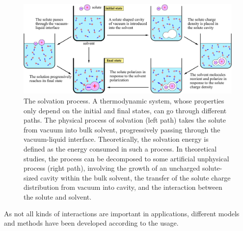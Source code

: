 \begin{figure}[h]
\centering{}\textcolor{red}{}%
\begin{minipage}[t]{1\textwidth}%
\begin{center}
\includegraphics[width=1\columnwidth]{_figure/solvation}\caption[The solvation process]{The solvation process.\label{fig:Process-of-solvation} A thermodynamic
system, whose properties only depend on the initial and final states,
can go through different paths. The physical process of solvation
(left path) takes the solute from vacuum into bulk solvent, progressively
passing through the vacuum-liquid interface. Theoretically, the solvation
energy is defined as the energy consumed in such a process. In theoretical
studies, the process can be decomposed to some artificial unphysical
process (right path), involving the growth of an uncharged solute-sized
cavity within the bulk solvent, the transfer of the solute charge
distribution from vacuum into cavity, and the interaction between
the solute and solvent.}

\par\end{center}%
\end{minipage}
\end{figure}


As not all kinds of interactions are important in applications, different
models and methods have been developed according to the usage.

